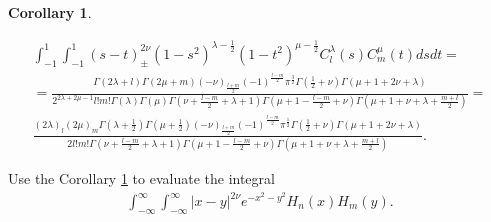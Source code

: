\documentclass{article}
\newcommand{\tmdummy}{$\mbox{}$}
\newtheorem{corollary}{Corollary}
\begin{document}
\begin{corollary}
  \label{cor}{\tmdummy}
  
  \begin{eqnarray}
    & \int_{- 1}^1 \int_{- 1}^1 (s - t)_{\pm}^{2 \nu} (1 - s^2)^{\lambda -
    \frac{1}{2}} (1 - t^2)^{\mu - \frac{1}{2}} C_l^{\lambda} (s) C_m^{\mu} (t)
    d s d t = &  \nonumber\\
    & = \frac{\Gamma (2 \lambda + l) \Gamma (2 \mu + m) (- \nu)_{\frac{l +
    m}{2}} (- 1)^{\frac{l - m}{2}} \pi^{\frac{3}{2}} \Gamma \left( \frac{1}{2}
    + \nu \right) \Gamma (\mu + 1 + 2 \nu + \lambda)}{2^{2 \lambda + 2 \mu -
    1} l!m! \Gamma (\lambda) \Gamma (\mu) \Gamma \left( \nu + \frac{l - m}{2}
    + \lambda + 1 \right) \Gamma \left( \mu + 1 - \frac{l - m}{2} + \nu
    \right) \Gamma \left( \mu + 1 + \nu + \lambda + \frac{m + l}{2} \right)} =
    &  \nonumber\\
    & \frac{(2 \lambda)_l (2 \mu)_m \Gamma \left( \lambda + \frac{1}{2}
    \right) \Gamma \left( \mu + \frac{1}{2} \right) (- \nu)_{\frac{l + m}{2}}
    (- 1)^{\frac{l - m}{2}} \pi^{\frac{1}{2}} \Gamma \left( \frac{1}{2} + \nu
    \right) \Gamma (\mu + 1 + 2 \nu + \lambda)}{2 l!m! \Gamma \left( \nu +
    \frac{l - m}{2} + \lambda + 1 \right) \Gamma \left( \mu + 1 - \frac{l -
    m}{2} + \nu \right) \Gamma \left( \mu + 1 + \nu + \lambda + \frac{m +
    l}{2} \right)} . &  \nonumber
  \end{eqnarray}
\end{corollary}

\begin{question}
  \label{q14}Use the Corollary \ref{cor} to evaluate the integral
  \begin{eqnarray}
    & \int_{- \infty}^{\infty} \int_{- \infty}^{\infty} | x - y |^{2 \nu}
    e^{- x^2 - y^2} H_n (x) H_m (y) . &  \nonumber
  \end{eqnarray}
\end{question}
\end{document}
